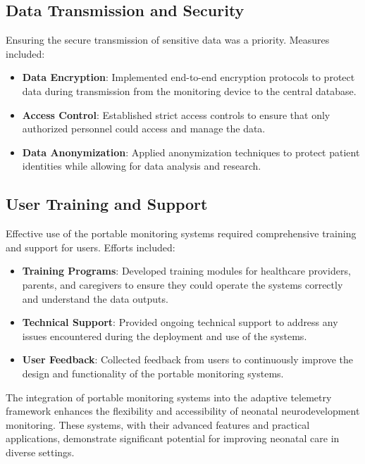 \documentclass[12pt,journal,compsoc]{IEEEtran}
\begin{document}
\subsection{Data Transmission and Security}
Ensuring the secure transmission of sensitive data was a priority. Measures included:
\begin{itemize}
    \item \textbf{Data Encryption}: Implemented end-to-end encryption protocols to protect data during transmission from the monitoring device to the central database.
    \item \textbf{Access Control}: Established strict access controls to ensure that only authorized personnel could access and manage the data.
    \item \textbf{Data Anonymization}: Applied anonymization techniques to protect patient identities while allowing for data analysis and research.
\end{itemize}

\subsection{User Training and Support}
Effective use of the portable monitoring systems required comprehensive training and support for users. Efforts included:
\begin{itemize}
    \item \textbf{Training Programs}: Developed training modules for healthcare providers, parents, and caregivers to ensure they could operate the systems correctly and understand the data outputs.
    \item \textbf{Technical Support}: Provided ongoing technical support to address any issues encountered during the deployment and use of the systems.
    \item \textbf{User Feedback}: Collected feedback from users to continuously improve the design and functionality of the portable monitoring systems.
\end{itemize}

The integration of portable monitoring systems into the adaptive telemetry framework enhances the flexibility and accessibility of neonatal neurodevelopment monitoring. These systems, with their advanced features and practical applications, demonstrate significant potential for improving neonatal care in diverse settings.

\end{document}
